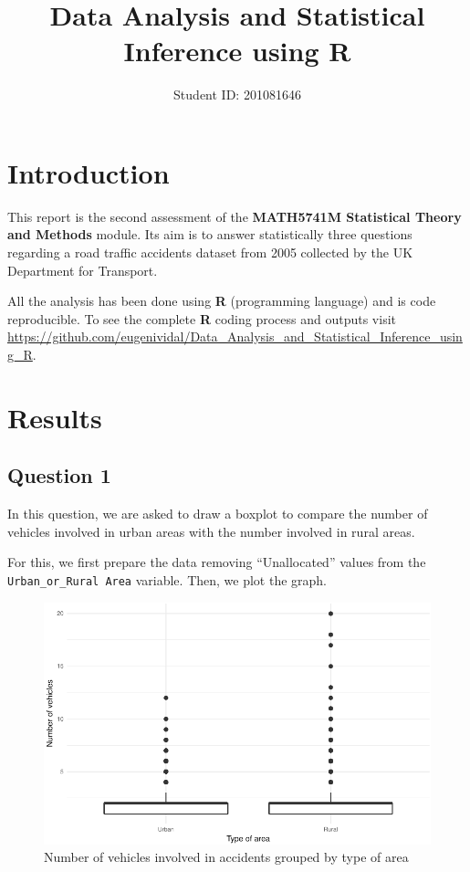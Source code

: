 \documentclass[]{article}
\title{Data Analysis and Statistical Inference using R}
\author{Student ID: 201081646}
\date{}
\begin{document}
\maketitle

\section{Introduction}\label{introduction}

This report is the second assessment of the \textbf{MATH5741M
Statistical Theory and Methods} module. Its aim is to answer
statistically three questions regarding a road traffic accidents dataset
from 2005 collected by the UK Department for Transport.

All the analysis has been done using \textbf{R} (programming language)
and is code reproducible. To see the complete \textbf{R} coding process
and outputs visit
\url{https://github.com/eugenividal/Data_Analysis_and_Statistical_Inference_using_R}.

\section{Results}\label{results}

\subsection{Question 1}\label{question-1}

In this question, we are asked to draw a boxplot to compare the number
of vehicles involved in urban areas with the number involved in rural
areas.

For this, we first prepare the data removing ``Unallocated'' values from
the \texttt{Urban\_or\_Rural\ Area} variable. Then, we plot the graph.

\begin{figure}[H]

{\centering \includegraphics{README_files/figure-latex/fig-1} 

}

\caption{Number of vehicles involved in accidents grouped by type of area}\label{fig:fig}
\end{figure}
\end{document}
